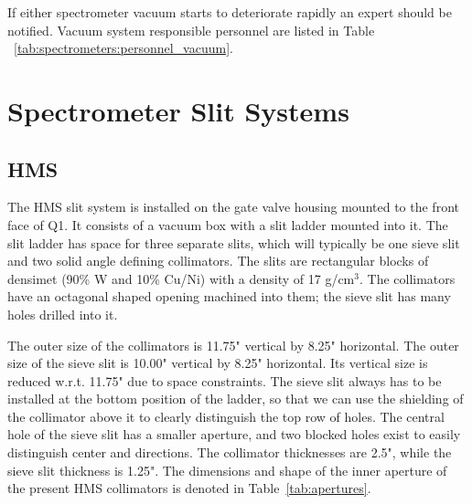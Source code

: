 If either spectrometer vacuum starts to deteriorate rapidly an expert should be notified.
Vacuum system responsible personnel are listed in Table ~\ref{tab:spectrometers:personnel_vacuum}.



\section{Spectrometer Slit Systems}
\label{sec:slit}

\subsection{HMS}
\label{sssec:hms_slit}
The HMS slit system is installed on the gate valve housing mounted to the
front face of Q1. It consists of a vacuum box with a slit ladder
mounted into it. The slit ladder has space for three separate slits,
which will typically be one sieve slit and two solid angle defining collimators.
The slits are rectangular blocks of densimet (90\% W and 10\% Cu/Ni)
with a density of 17 g/cm$^3$. The collimators have an octagonal shaped
opening machined into them; the sieve slit has many holes drilled
into it.

The outer size of the collimators is 11.75" vertical by 8.25"
horizontal. The outer size of the sieve slit is 10.00" vertical
by 8.25" horizontal.
Its vertical size is reduced w.r.t. 11.75" due to space constraints.
The sieve slit always has to be installed at the bottom position of the ladder,
so that we can use the shielding of the collimator above it to
clearly distinguish the top row of holes. The central hole
of the sieve slit has a smaller aperture, and two blocked holes
exist to easily distinguish center and directions.
The collimator thicknesses are 2.5", while the sieve slit thickness
is 1.25". The dimensions and shape of the inner aperture of the present
HMS collimators is denoted in Table~\ref{tab:apertures}.

